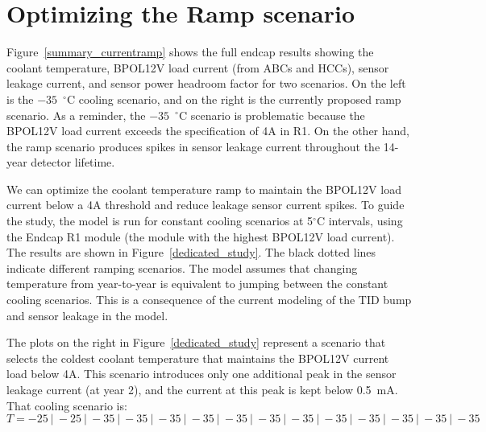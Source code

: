 
\section{Optimizing the Ramp scenario}
\label{ramp_optimization}

Figure~\ref{summary_currentramp} shows the full endcap results showing the coolant temperature,
BPOL12V load current (from ABCs and HCCs), sensor leakage current, and sensor power headroom factor
for two scenarios. On the left is the $-35$~$^{\circ}$C cooling scenario, and on the right is the
currently proposed ramp scenario. As a reminder, the $-35$~$^{\circ}$C scenario is problematic because
the BPOL12V load current exceeds the specification of 4A in R1. On the other hand, the ramp scenario
produces spikes in sensor leakage current throughout the 14-year detector lifetime.

We can optimize the coolant temperature ramp to maintain the BPOL12V load current below a 4A threshold
and reduce leakage sensor current spikes. To guide the study, the model is run for constant cooling
scenarios at 5$^{\circ}$C
intervals, using the Endcap R1 module (the module with the highest BPOL12V load current). 
The results are shown in Figure~\ref{dedicated_study}. The black
dotted lines indicate different ramping scenarios. The model assumes that changing temperature from
year-to-year is equivalent to jumping between the constant cooling scenarios. This is a consequence of
the current modeling of the TID bump and sensor leakage in the model.

The plots on the right in Figure~\ref{dedicated_study} represent a scenario that selects the coldest
coolant temperature that maintains the BPOL12V current load below 4A. This scenario introduces only
one additional peak in the sensor leakage current (at year 2), and the current at this peak is kept
below 0.5~mA. That cooling scenario is:
\begin{equation}
T = {-}25~|~{-}25~|~{-}35~|~{-}35~|~{-}35~|~{-}35~|~{-}35~|~{-}35~|~{-}35~|~{-}35~|~{-}35~|~{-}35~|~{-}35~|~{-}35
\label{eq:proposal1}
\end{equation}

